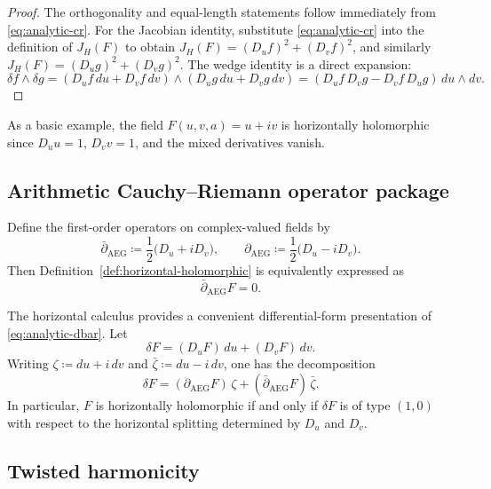 \begin{proof}
The orthogonality and equal-length statements follow immediately from \eqref{eq:analytic-cr}. For the Jacobian identity,
substitute \eqref{eq:analytic-cr} into the definition of $J_H(F)$ to obtain $J_H(F)=(D_u f)^2+(D_v f)^2$, and similarly $J_H(F)=(D_u g)^2+(D_v g)^2$. The wedge identity is a direct expansion:
\[
\delta f\wedge \delta g
=(D_u f\,du+D_v f\,dv)\wedge(D_u g\,du+D_v g\,dv)
=(D_u f\,D_v g-D_v f\,D_u g)\,du\wedge dv.
\]
\end{proof}

As a basic example, the field $F(u,v,a)=u+iv$ is horizontally holomorphic since $D_u u=1$, $D_v v=1$, and the mixed derivatives vanish.

\subsection{Arithmetic Cauchy--Riemann operator package}\label{subsec:analytic-cr-operator}

Define the first-order operators on complex-valued fields by
\begin{equation}\label{eq:analytic-dbar}
\bar\partial_{\mathrm{AEG}}\coloneqq \frac12\bigl(D_u+iD_v\bigr),
\qquad
\partial_{\mathrm{AEG}}\coloneqq \frac12\bigl(D_u-iD_v\bigr).
\end{equation}
Then Definition~\ref{def:horizontal-holomorphic} is equivalently expressed as
\begin{equation}\label{eq:analytic-dbar-equation}
\bar\partial_{\mathrm{AEG}}F=0.
\end{equation}

The horizontal calculus provides a convenient differential-form presentation of \eqref{eq:analytic-dbar}. Let
\[
\delta F=(D_uF)\,du+(D_vF)\,dv.
\]
Writing $\zeta\coloneqq du+i\,dv$ and $\bar\zeta\coloneqq du-i\,dv$, one has the decomposition
\begin{equation}\label{eq:analytic-delta-decomposition}
\delta F=(\partial_{\mathrm{AEG}}F)\,\zeta+(\bar\partial_{\mathrm{AEG}}F)\,\bar\zeta.
\end{equation}
In particular, $F$ is horizontally holomorphic if and only if $\delta F$ is of type $(1,0)$ with respect to the horizontal splitting determined by $D_u$ and $D_v$.

\subsection{Twisted harmonicity}\label{subsec:analytic-twisted-harmonicity}

